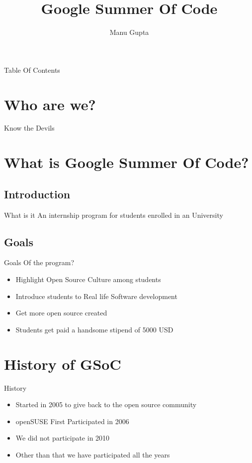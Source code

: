 \documentclass{beamer}
\begin{document}
\title{Google Summer Of Code}
\author{Manu Gupta}

\begin{frame}
\titlepage
\end{frame}

\begin{frame}{Table Of Contents}
\tableofcontents
\end{frame}

\section{Who are we?}
\begin{frame}{Know the Devils}

\end{frame}


\section{What is Google Summer Of Code?}
\subsection{Introduction}
\begin{frame}{What is it}
An internship program for students enrolled in an University
\end{frame}

\subsection{Goals}
\begin{frame}{Goals Of the program?}
\pause
\begin{itemize}
\item Highlight Open Source Culture among students \pause
\item Introduce students to Real life Software development \pause
\item Get more open source created \pause
\item Students get paid a handsome stipend of 5000 USD 
\end{itemize}
\end{frame}

\section{History of GSoC}
\begin{frame}{History}\pause
\begin{itemize}
\item Started in 2005 to give back to the open source community \pause
\item openSUSE First Participated in 2006 \pause
\item We did not participate in 2010 \pause
\item Other than that we have participated all the years 
\end{itemize}
\end{frame}
\end{document}
